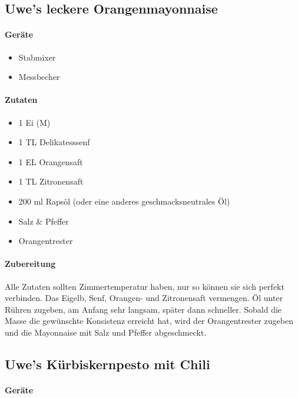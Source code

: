 \subsection{Uwe's leckere Orangenmayonnaise}\label{Orangenmayo}

\paragraph{Geräte}

\begin{itemize}[noitemsep]
	\item Stabmixer
	\item Messbecher
\end{itemize}

\paragraph{Zutaten}

\begin{itemize}[noitemsep]
	\item 1 Ei (M)
	\item 1 TL Delikatesssenf
	\item 1 EL Orangensaft
	\item 1 TL Zitronensaft
	\item 200 ml Rapsöl (oder eine anderes geschmacksneutrales Öl)
	\item Salz \& Pfeffer
	\item Orangentrester
\end{itemize}

\paragraph{Zubereitung}

Alle Zutaten sollten Zimmertemperatur haben, nur so können sie sich perfekt 
verbinden. Das Eigelb, Senf, Orangen- und Zitronensaft vermengen. Öl unter Rühren zugeben, am Anfang sehr langsam, später dann schneller. Sobald die Masse die gewünschte Konsistenz erreicht hat, wird der Orangentrester zugeben und die Mayonnaise mit Salz und Pfeffer abgeschmeckt.

\subsection{Uwe's Kürbiskernpesto mit Chili}

\paragraph{Geräte}

